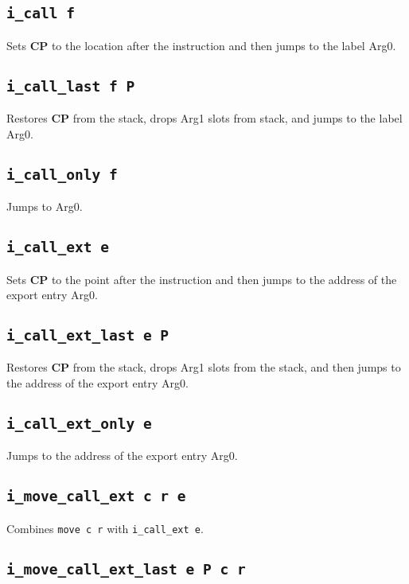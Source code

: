 \documentclass{article}
\newcommand{\cp}{\textbf{CP}}
\newcommand{\iop}[1]{\texttt{#1}}
\begin{document}
\subsection*{\iop{i\_call f}}

Sets \cp{} to the location after the instruction and then jumps to the label
Arg0.

\subsection*{\iop{i\_call\_last f P}}

Restores \cp{} from the stack, drops Arg1 slots from stack, and jumps to the
label Arg0.

\subsection*{\iop{i\_call\_only f}}

Jumps to Arg0.

\subsection*{\iop{i\_call\_ext e}}

Sets \cp{} to the point after the instruction and then jumps to the address of
the export entry Arg0.

\subsection*{\iop{i\_call\_ext\_last e P}}

Restores \cp{} from the stack, drops Arg1 slots from the stack, and then jumps
to the address of the export entry Arg0.

\subsection*{\iop{i\_call\_ext\_only e}}

Jumps to the address of the export entry Arg0.

\subsection*{\iop{i\_move\_call\_ext c r e}}

Combines \iop{move c r} with \iop{i\_call\_ext e}.

\subsection*{\iop{i\_move\_call\_ext\_last e P c r}}
\end{document}
